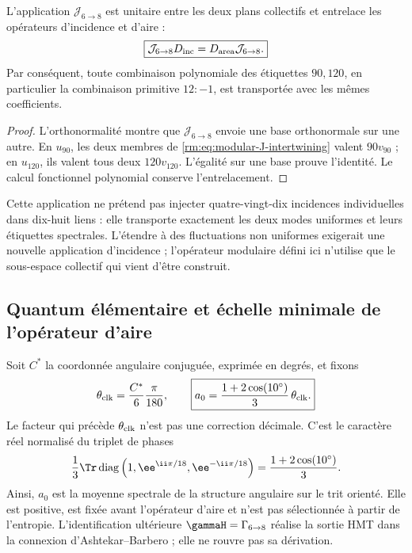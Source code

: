 \begin{theorem}
\label{rm:thm:modular-J68}
L'application \(\mathcal J_{6\to8}\) est unitaire entre les deux plans
collectifs et entrelace les opérateurs d'incidence et d'aire :
\begin{equation}
\label{rm:eq:modular-J-intertwining}
\boxed{
\mathcal J_{6\to8}D_{\rm inc}
=D_{\rm area}\mathcal J_{6\to8}.}
\end{equation}
Par conséquent, toute combinaison polynomiale des étiquettes \(90,120\), en
particulier la combinaison primitive \(12:-1\), est transportée avec les
mêmes coefficients.
\end{theorem}

\begin{proof}
L'orthonormalité montre que \(\mathcal J_{6\to8}\) envoie une base
orthonormale sur une autre. En \(u_{90}\), les deux membres de
\cref{rm:eq:modular-J-intertwining} valent \(90v_{90}\) ; en \(u_{120}\),
ils valent tous deux \(120v_{120}\). L'égalité sur une base prouve l'identité.
Le calcul fonctionnel polynomial conserve l'entrelacement.
\end{proof}

Cette application ne prétend pas injecter quatre-vingt-dix incidences individuelles dans
dix-huit liens : elle transporte exactement les deux modes uniformes et leurs
étiquettes spectrales. L'étendre à des fluctuations non uniformes exigerait
une nouvelle application d'incidence ; l'opérateur modulaire défini ici n'utilise que
le sous-espace collectif qui vient d'être construit.

\subsection{Quantum élémentaire et échelle minimale de l’opérateur d’aire}

Soit \(C^*\) la coordonnée angulaire conjuguée, exprimée en degrés, et fixons
\begin{equation}
\label{rm:eq:modular-theta-clock-a0}
\theta_{\rm clk}=\frac{C^*}{6}\frac{\pi}{180},
\qquad
\boxed{
a_0=\frac{1+2\cos(10^\circ)}{3}\,\theta_{\rm clk}.}
\end{equation}
Le facteur qui précède \(\theta_{\rm clk}\) n'est pas une correction
décimale. C'est le caractère réel normalisé du triplet de phases
\begin{equation}
\label{rm:eq:modular-c10-character}
\frac13\Tr\operatorname{diag}
\left(1,\ee^{\ii\pi/18},\ee^{-\ii\pi/18}\right)
=\frac{1+2\cos(10^\circ)}3.
\end{equation}
Ainsi, \(a_0\) est la moyenne spectrale de la structure angulaire sur le trit
orienté. Elle est positive, est fixée avant l'opérateur d'aire et n'est pas
sélectionnée à partir de l'entropie. L'identification ultérieure
\(\gammaH=\Gamma_{6\to8}\) réalise la sortie HMT dans la connexion
d'Ashtekar--Barbero \cite{Barbero1995,Immirzi1997} ; elle ne rouvre pas sa dérivation.

